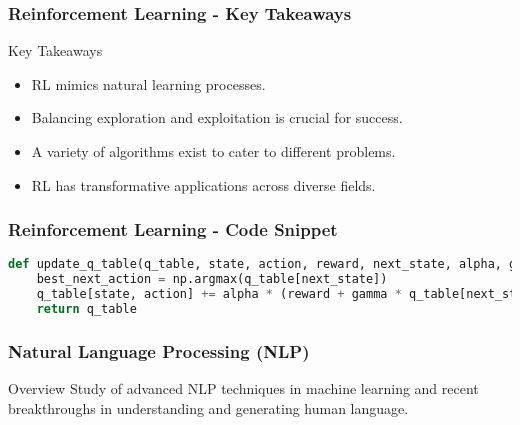 \documentclass[aspectratio=169]{beamer}
\begin{document}
\begin{frame}[fragile]
    \frametitle{Reinforcement Learning - Key Takeaways}
    \begin{block}{Key Takeaways}
        \begin{itemize}
            \item RL mimics natural learning processes.
            \item Balancing exploration and exploitation is crucial for success.
            \item A variety of algorithms exist to cater to different problems.
            \item RL has transformative applications across diverse fields.
        \end{itemize}
    \end{block}
\end{frame}

\begin{frame}[fragile]
    \frametitle{Reinforcement Learning - Code Snippet}
    \begin{lstlisting}[language=Python]
def update_q_table(q_table, state, action, reward, next_state, alpha, gamma):
    best_next_action = np.argmax(q_table[next_state])
    q_table[state, action] += alpha * (reward + gamma * q_table[next_state, best_next_action] - q_table[state, action])
    return q_table
    \end{lstlisting}
\end{frame}

\begin{frame}
    \frametitle{Natural Language Processing (NLP)}
    \begin{block}{Overview}
        Study of advanced NLP techniques in machine learning and recent breakthroughs in understanding and generating human language.
    \end{block}
\end{frame}
\end{document}
